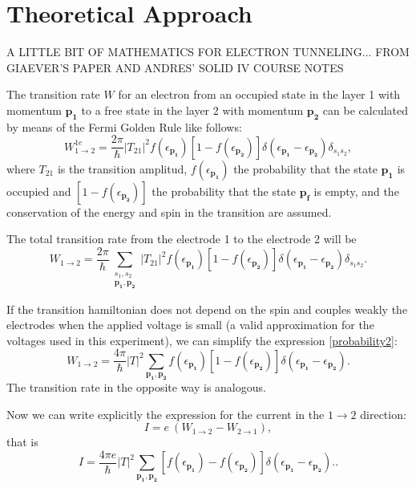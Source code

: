 \documentclass[twocolumn, twoside,a4paper,10pt]{article}
\begin{document}
\section{Theoretical Approach}
A LITTLE BIT OF MATHEMATICS FOR ELECTRON TUNNELING... FROM GIAEVER'S PAPER AND ANDRES' SOLID IV COURSE NOTES

The transition rate $W$ for an electron from an occupied state in the layer 1 with momentum $\mathbf{p_1}$ to a free state in the layer 2 with momentum $\mathbf{p_2}$ can be calculated by means of the Fermi Golden Rule like follows:
\begin{equation}\label{probability1}
W_{1\to 2}^{1e} = \frac{2\pi}{\hbar} |T_{21}|^2 f(\epsilon_{\mathbf{p_1}}) [1-f(\epsilon_{\mathbf{p_2}})]
		\delta(\epsilon_{\mathbf{p_1}}-\epsilon_{\mathbf{p_2}})\delta_{s_1s_2},
\end{equation}
where $T_{21}$ is the transition amplitud, $ f(\epsilon_{\mathbf{p_1}})$ the probability that the state $\mathbf{p_1}$ is occupied and  $[1-f(\epsilon_{\mathbf{p_2}})]$ the probability that the state $\mathbf{p_f}$ is empty, and the conservation of the energy and spin in the transition are assumed. 

The total transition rate from the electrode 1 to the electrode 2 will be
\begin{equation}\label{probability2}
W_{1\to 2} = \frac{2\pi}{\hbar} \sum_{\substack{s_1,s_2\\ \mathbf{p_1},\mathbf{p_2}}} |T_{21}|^2 
		f(\epsilon_{\mathbf{p_1}}) [1-f(\epsilon_{\mathbf{p_2}})] 
		\delta(\epsilon_{\mathbf{p_1}}-\epsilon_{\mathbf{p_2}})\delta_{s_1s_2}.
\end{equation}

If the transition hamiltonian does not depend on the spin and couples weakly the electrodes when the applied voltage is small (a valid approximation for the voltages used in this experiment), we can simplify the expression \eqref{probability2}:
\begin{equation}\label{probability3}
W_{1\to 2} = \frac{4\pi}{\hbar} |T|^2 \sum_{\mathbf{p_1},\mathbf{p_2}}  
		f(\epsilon_{\mathbf{p_1}}) [1-f(\epsilon_{\mathbf{p_2}})] 
		\delta(\epsilon_{\mathbf{p_1}}-\epsilon_{\mathbf{p_2}}).
\end{equation}
The transition rate in the opposite way is analogous.

Now we can write explicitly the expression for the current in the $1\to 2$ direction:
\begin{equation}\label{current1}
I = e\ (W_{1\to 2} - W_{2\to 1}),
\end{equation}
that is
\begin{equation}\label{current2}
I = \frac{4\pi e}{\hbar} |T|^2 \sum_{\mathbf{p_1},\mathbf{p_2}}  
		[f(\epsilon_{\mathbf{p_1}})-f(\epsilon_{\mathbf{p_2}})] 
		\delta(\epsilon_{\mathbf{p_1}}-\epsilon_{\mathbf{p_2}})..
\end{equation}
\end{document}
